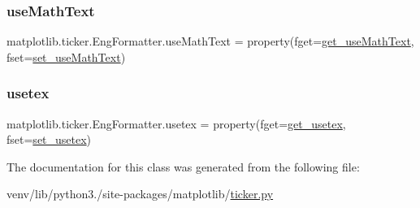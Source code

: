 \subsubsection{\texorpdfstring{use\+Math\+Text}{useMathText}}
{\footnotesize\ttfamily matplotlib.\+ticker.\+Eng\+Formatter.\+use\+Math\+Text = property(fget=\hyperlink{classmatplotlib_1_1ticker_1_1EngFormatter_a750de40e2dc3836c5a6cd3dd687628f2}{get\+\_\+use\+Math\+Text}, fset=\hyperlink{classmatplotlib_1_1ticker_1_1EngFormatter_ad3f4d5a8f93c3359ae9803c4a514dfe1}{set\+\_\+use\+Math\+Text})\hspace{0.3cm}{\ttfamily [static]}}

\mbox{\label{classmatplotlib_1_1ticker_1_1EngFormatter_a6c468506265aea1c1e318189b85ba090}} 
\subsubsection{\texorpdfstring{usetex}{usetex}}
{\footnotesize\ttfamily matplotlib.\+ticker.\+Eng\+Formatter.\+usetex = property(fget=\hyperlink{classmatplotlib_1_1ticker_1_1EngFormatter_ad6bc6039174ded9f7c635daafb5a374b}{get\+\_\+usetex}, fset=\hyperlink{classmatplotlib_1_1ticker_1_1EngFormatter_ab94e885a78e1664f26dce91fc3c57ea7}{set\+\_\+usetex})\hspace{0.3cm}{\ttfamily [static]}}



The documentation for this class was generated from the following file\+:\begin{DoxyCompactItemize}
\item 
venv/lib/python3./site-\/packages/matplotlib/\hyperlink{ticker_8py}{ticker.\+py}\end{DoxyCompactItemize}
